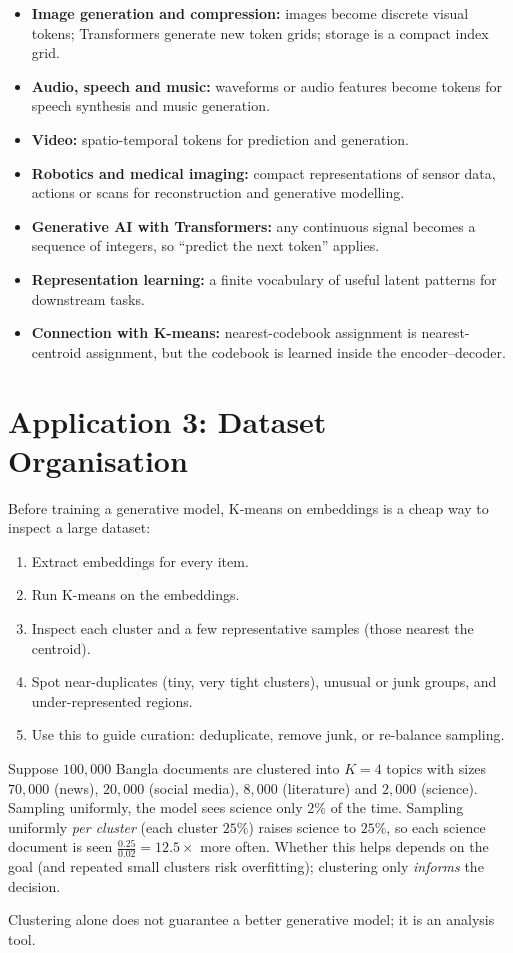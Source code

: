 \documentclass[11pt,a4paper]{article}
\begin{document}
\begin{itemize}[nosep]
\item \textbf{Image generation and compression:} images become discrete visual tokens; Transformers generate new token grids; storage is a compact index grid.
\item \textbf{Audio, speech and music:} waveforms or audio features become tokens for speech synthesis and music generation.
\item \textbf{Video:} spatio-temporal tokens for prediction and generation.
\item \textbf{Robotics and medical imaging:} compact representations of sensor data, actions or scans for reconstruction and generative modelling.
\item \textbf{Generative AI with Transformers:} any continuous signal becomes a sequence of integers, so ``predict the next token'' applies.
\item \textbf{Representation learning:} a finite vocabulary of useful latent patterns for downstream tasks.
\item \textbf{Connection with K-means:} nearest-codebook assignment is nearest-centroid assignment, but the codebook is learned inside the encoder--decoder.
\end{itemize}

\section{Application 3: Dataset Organisation}

Before training a generative model, K-means on embeddings is a cheap way to inspect a large dataset:
\begin{enumerate}[nosep]
\item Extract embeddings for every item.
\item Run K-means on the embeddings.
\item Inspect each cluster and a few representative samples (those nearest the centroid).
\item Spot near-duplicates (tiny, very tight clusters), unusual or junk groups, and under-represented regions.
\item Use this to guide curation: deduplicate, remove junk, or re-balance sampling.
\end{enumerate}

\begin{example}
Suppose $100{,}000$ Bangla documents are clustered into $K=4$ topics with sizes $70{,}000$ (news), $20{,}000$ (social media), $8{,}000$ (literature) and $2{,}000$ (science). Sampling uniformly, the model sees science only $2\%$ of the time. Sampling uniformly \emph{per cluster} (each cluster $25\%$) raises science to $25\%$, so each science document is seen $\frac{0.25}{0.02}=12.5\times$ more often. Whether this helps depends on the goal (and repeated small clusters risk overfitting); clustering only \emph{informs} the decision.
\end{example}
Clustering alone does not guarantee a better generative model; it is an analysis tool.
\end{document}
